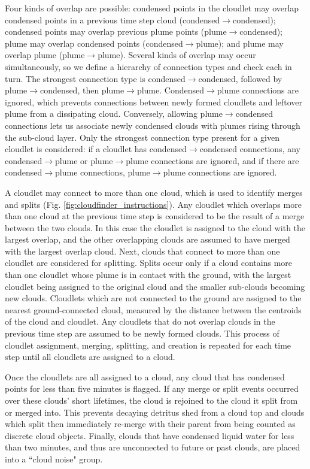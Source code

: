 \documentclass[acp]{copernicus}
\begin{document}
Four kinds of overlap are possible: condensed points in the cloudlet may 
overlap condensed points in a previous time step cloud 
(condensed$\rightarrow$condensed); condensed points may overlap previous 
plume points (plume$\rightarrow$condensed); plume may overlap condensed 
points (condensed$\rightarrow$plume); and plume may overlap plume 
(plume$\rightarrow$plume).  Several kinds of overlap may occur 
simultaneously, so we define a hierarchy of connection types and check each in 
turn.  The strongest connection type is condensed$\rightarrow$condensed, 
followed by plume$\rightarrow$condensed, then plume$\rightarrow$plume.  
Condensed$\rightarrow$plume connections are ignored, which prevents 
connections between newly formed cloudlets and leftover plume from a 
dissipating cloud.  Conversely, allowing plume$\rightarrow$condensed 
connections lets us associate newly condensed clouds with plumes rising through 
the sub-cloud layer.  Only the strongest connection type present for a given 
cloudlet is considered: if a cloudlet has condensed$\rightarrow$condensed 
connections, any condensed$\rightarrow$plume or plume$\rightarrow$plume 
connections are ignored, and if there are condensed$\rightarrow$plume 
connections, plume$\rightarrow$plume connections are ignored.  

A cloudlet may connect to more than one cloud, which is used to identify merges 
and splits (Fig. \ref{fig:cloudfinder_instructions}).  Any cloudlet which 
overlaps more than one cloud at the previous time step is considered to be the 
result of a merge between the two clouds.  In this case the cloudlet is 
assigned to the cloud with the largest overlap, and the other overlapping 
clouds are assumed to have merged with the largest overlap cloud.  Next, clouds 
that connect to more than one cloudlet are considered for splitting.  Splits 
occur only if a cloud contains more than one cloudlet whose plume is in contact 
with the ground, with the largest cloudlet being assigned to the original cloud 
and the smaller sub-clouds becoming new clouds. Cloudlets which are not 
connected to the ground are assigned to the nearest ground-connected cloud, 
measured by the distance between the centroids of the cloud and cloudlet.  Any 
cloudlets that do not overlap clouds in the previous time step are assumed to 
be newly formed clouds.  This process of cloudlet assignment, merging, 
splitting, and creation is repeated for each time step until all cloudlets are 
assigned to a cloud.
  
Once the cloudlets are all assigned to a cloud, any cloud that has condensed 
points for less than five minutes is flagged.  If any merge or split events 
occurred over these clouds' short lifetimes, the cloud is rejoined to the cloud 
it split from or merged into.  This prevents decaying detritus shed from a 
cloud top and clouds which split then immediately re-merge with their parent 
from being counted as discrete cloud objects.  Finally, clouds that have 
condensed liquid water for less than two minutes, and thus are unconnected to 
future or past clouds, are placed into a ``cloud noise" group. 
\end{document}
